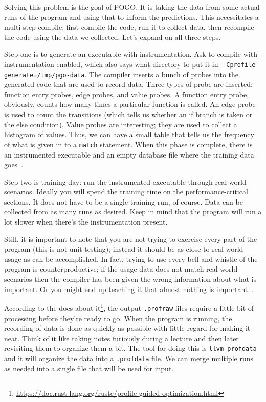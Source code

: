 Solving this problem is the goal of POGO. It is taking the data from some actual runs of the program and using that to inform the predictions. This necessitates a multi-step compile: first compile the code, run it to collect data, then recompile the code using the data we collected. Let's expand on all three steps.

Step one is to generate an executable with instrumentation. Ask to compile with instrumentation enabled, which also says what directory to put it in: \texttt{-Cprofile-generate=/tmp/pgo-data}. The compiler inserts a bunch of probes into the generated code that are used to record data. Three types of probe are inserted: function entry probes, edge probes, and value probes. A function entry probe, obviously, counts how many times a particular function is called. An edge probe is used to count the transitions (which tells us whether an if branch is taken or the else condition). Value probes are interesting; they are used to collect a histogram of values. Thus, we can have a small table that tells us the frequency of what is given in to a \texttt{match} statement. When this phase is complete, there is an instrumented executable and an empty database file where the training data goes~\cite{pogo}.

Step two is training day: run the instrumented executable through real-world scenarios. Ideally you will spend the training time on the performance-critical sections. It does not have to be a single training run, of course. Data can be collected from as many runs as desired. Keep in mind that the program will run a lot slower when there's the instrumentation present. 

Still, it is important to note that you are not trying to exercise every part of the program (this is not unit testing); instead it should be as close to real-world-usage as can be accomplished. In fact, trying to use every bell and whistle of the program is counterproductive; if the usage data does not match real world scenarios then the compiler has been given the wrong information about what is important. Or you might end up teaching it that almost nothing is important...

According to the docs about it\footnote{\url{https://doc.rust-lang.org/rustc/profile-guided-optimization.html}}, the output \texttt{.profraw} files require a little bit of processing before they're ready to go. When the program is running, the recording of data is done as quickly as possible with little regard for making it neat. Think of it like taking notes furiously during a lecture and then later revisiting them to organize them a bit. The tool for doing this is \texttt{llvm-profdata} and it will organize the data into a \texttt{.profdata} file. We can merge multiple runs as needed into a single file that will be used for input. 

